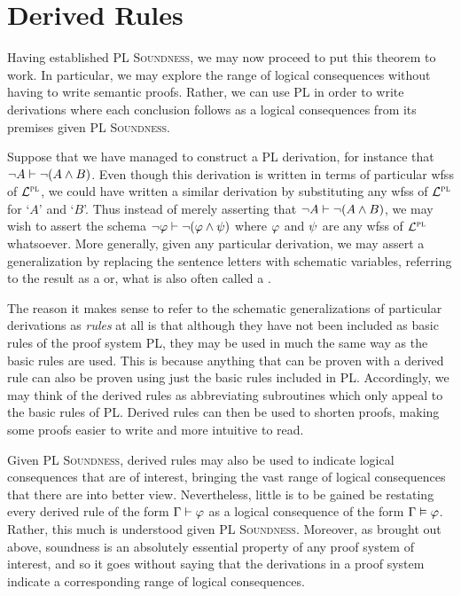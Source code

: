 \section{Derived Rules}
\label{sec:basic}

Having established \textsc{PL Soundness}, we may now proceed to put this theorem to work.
In particular, we may explore the range of logical consequences without having to write semantic proofs.
Rather, we can use PL in order to write derivations where each conclusion follows as a logical consequences from its premises given \textsc{PL Soundness}.

Suppose that we have managed to construct a PL derivation, for instance that $\neg A \vdash \neg (A \wedge B)$.
Even though this derivation is written in terms of particular wfss of $\mathcal{L}^{\textsc{pl}}$, we could have written a similar derivation by substituting any wfss of $\mathcal{L}^{\textsc{pl}}$ for `$A$' and `$B$'. 
Thus instead of merely asserting that $\neg A \vdash \neg (A \wedge B)$, we may wish to assert the schema $\neg \varphi \vdash \neg (\varphi \wedge \psi)$ where $\varphi$ and $\psi$ are any wfss of $\mathcal{L}^{\textsc{pl}}$ whatsoever.
More generally, given any particular derivation, we may assert a generalization by replacing the sentence letters with schematic variables, referring to the result as a  or, what is also often called a .

The reason it makes sense to refer to the schematic generalizations of particular derivations as \textit{rules} at all is that although they have not been included as basic rules of the proof system PL, they may be used in much the same way as the basic rules are used.
This is because anything that can be proven with a derived rule can also be proven using just the basic rules included in PL.
Accordingly, we may think of the derived rules as abbreviating subroutines which only appeal to the basic rules of PL.
Derived rules can then be used to shorten proofs, making some proofs easier to write and more intuitive to read.

Given \textsc{PL Soundness}, derived rules may also be used to indicate logical consequences that are of interest, bringing the vast range of logical consequences that there are into better view.
Nevertheless, little is to be gained be restating every derived rule of the form $\Gamma \vdash \varphi$ as a logical consequence of the form $\Gamma \vDash \varphi$. 
Rather, this much is understood given \textsc{PL Soundness}.
Moreover, as brought out above, soundness is an absolutely essential property of any proof system of interest, and so it goes without saying that the derivations in a proof system indicate a corresponding range of logical consequences.


